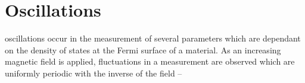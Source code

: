 \section{\dHvA Oscillations}

\dHvA oscillations occur in the measurement of several parameters which are dependant on the density of states at the Fermi surface of a material. As an increasing magnetic field is applied, fluctuations in a measurement are observed which are uniformly periodic with the inverse of the field -- 
